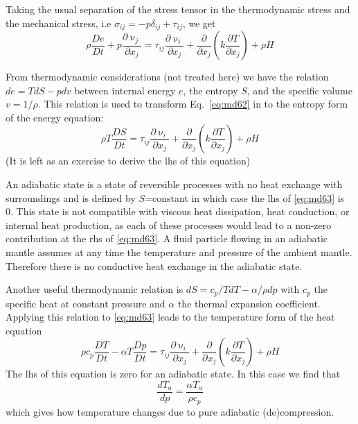 Taking the usual separation of the stress tensor in the thermodynamic stress and the
mechanical stress, i.e $\sigma_{ij} = -p \delta_{ij} + \tau_{ij}$, we get
\begin{equation}
\rho \frac{De}{Dt} + p \frac{\partial \upnu_j}{\partial x_j} 
= \tau_{ij} \frac{\partial \upnu_i}{\partial x_j} + 
\frac{\partial }{\partial x_j} (k \frac{\partial T}{\partial x_j}) + \rho H
\label{eq:md62}
\end{equation}

From thermodynamic considerations (not treated here) we have the relation
$de=TdS-p dv$ between internal energy $e$, the entropy $S$, 
and the specific volume $v=1/\rho$. 
This relation is used to transform Eq.~\eqref{eq:md62} in to the entropy form of the energy
equation:
\begin{equation}
\rho T \frac{DS}{Dt} = 
\tau_{ij} \frac{\partial \upnu_i}{\partial x_j} + 
\frac{\partial }{\partial x_j} (k \frac{\partial T}{\partial x_j}) + \rho H
\label{eq:md63}
\end{equation}
(It is left as an exercise to derive the lhs of this equation)


An adiabatic state is a state of reversible processes with no heat exchange with
surroundings and is defined by $S$=constant in which case the lhs of \eqref{eq:md63} is 0. 
This state is
not compatible with viscous heat dissipation, heat conduction, or internal heat production,
as each of these processes would lead to a non-zero contribution at the rhs of \eqref{eq:md63}. 
A fluid
particle flowing in an adiabatic mantle assumes at any time the temperature and pressure
of the ambient mantle. Therefore there is no conductive heat exchange in the adiabatic
state.

Another useful thermodynamic relation is $dS = c_p/T dT -\alpha/\rho dp$
with $c_p$ the specific heat at
constant pressure and $\alpha$ the thermal expansion coefficient. 
Applying this relation to \eqref{eq:md63}
leads to the temperature form of the heat equation
\begin{equation}
\rho c_p \frac{DT}{Dt} - \alpha T \frac{Dp}{Dt} = 
\tau_{ij} \frac{\partial \upnu_i}{\partial x_j} + 
\frac{\partial }{\partial x_j} (k \frac{\partial T}{\partial x_j}) + \rho H
\label{eq:md64}
\end{equation}
The lhs of this equation is zero for an adiabatic state. In this case we find that
\begin{equation}
\frac{dT_a}{dp} = \frac{\alpha T_a}{\rho c_p}
\label{eq:md65}
\end{equation}
which gives how temperature changes due to pure adiabatic (de)compression.

